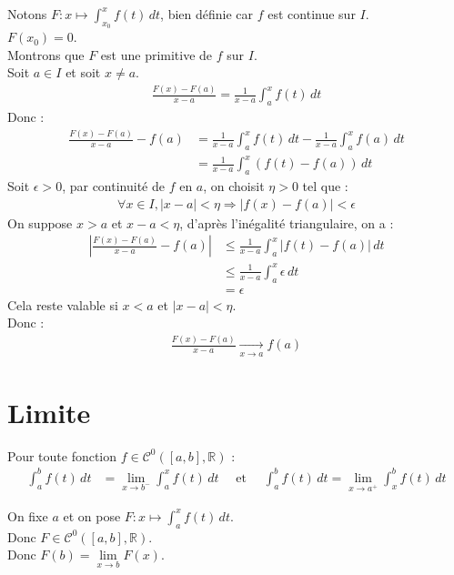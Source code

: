 \documentclass[../main.tex]{subfiles}
\begin{document}
\noindent Notons $F:x\mapsto \int_{x_0}^{x} f(t) \,dt$, bien définie car $f$ est continue sur $I$. \\
$F(x_0) = 0$. \\
Montrons que $F$ est une primitive de $f$ sur $I$. \\
Soit $a\in I$ et soit $x\neq a$. 
\begin{align*}
    \frac{F(x) - F(a)}{x - a} = \frac{1}{x - a} \int_{a}^{x} f(t) \,dt
\end{align*}
Donc : 
\begin{align*}
    \frac{F(x) - F(a)}{x - a} - f(a) &= \frac{1}{x - a} \int_{a}^{x} f(t) \,dt - \frac{1}{x - a} \int_{a}^{x} f(a) \,dt \\
    &= \frac{1}{x - a} \int_{a}^{x} (f(t) - f(a)) \,dt
\end{align*}
Soit $\epsilon > 0$, par continuité de $f$ en $a$, on choisit $\eta > 0$ tel que : 
\begin{align*}
    \forall x\in I, |x - a| < \eta \Rightarrow |f(x) - f(a)| < \epsilon
\end{align*}
On suppose $x > a$ et $x - a < \eta$, d'après l'inégalité triangulaire, on a : \\
\begin{align*}
    \left| \frac{F(x) - F(a)}{x - a} - f(a) \right| &\leq \frac{1}{x - a} \int_{a}^{x} |f(t) - f(a)| \,dt \\
    &\leq \frac{1}{x - a} \int_{a}^{x} \epsilon \,dt \\
    &= \epsilon
\end{align*}
Cela reste valable si $x < a$ et $|x - a| < \eta$. \\
Donc : 
\begin{align*}
    \frac{F(x) - F(a)}{x - a} \underset{x \to a}{\longrightarrow} f(a)
\end{align*}

\section{Limite}
\begin{tcolorbox}[title=Propostion 26.66, title filled=false, colframe=lightblue, colback=lightblue!10!white]
    Pour toute fonction $f\in \mathcal{C}^0([a, b], \mathbb{R})$ : 
    \begin{align*}
        \int_{a}^{b} f(t) \,dt &= \lim_{x\to b^-} \int_{a}^{x} f(t) \,dt \quad\text{ et }\quad \int_{a}^{b} f(t) \,dt = \lim_{x\to a^+} \int_{x}^{b} f(t) \,dt
    \end{align*}
\end{tcolorbox}

\noindent On fixe $a$ et on pose $F:x\mapsto \int_{a}^{x} f(t) \,dt$. \\
Donc $F\in \mathcal{C}^0([a, b], \mathbb{R})$. \\
Donc $F(b) = \lim\limits_{x\to b} F(x)$. 
\end{document}
